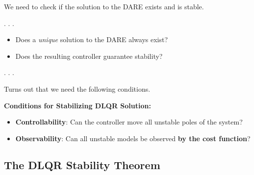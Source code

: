 \documentclass[
  letterpaper,
  DIV=11,
  numbers=noendperiod,
  oneside]{scrartcl}
\providecommand{\tightlist}{%
  \setlength{\itemsep}{0pt}\setlength{\parskip}{0pt}}
\begin{document}
We need to check if the solution to the DARE exists and is stable.

. . .

\begin{tcolorbox}[enhanced jigsaw, rightrule=.15mm, coltitle=black, titlerule=0mm, breakable, title=\textcolor{quarto-callout-tip-color}{\faLightbulb}\hspace{0.5em}{Questions}, bottomrule=.15mm, colback=white, toprule=.15mm, opacityback=0, opacitybacktitle=0.6, leftrule=.75mm, left=2mm, colbacktitle=quarto-callout-tip-color!10!white, bottomtitle=1mm, toptitle=1mm, arc=.35mm, colframe=quarto-callout-tip-color-frame]

\begin{itemize}
\tightlist
\item
  Does a \emph{unique} solution to the DARE always exist?
\item
  Does the resulting controller guarantee stability?
\end{itemize}

\end{tcolorbox}

. . .

Turns out that we need the following conditions.

\textbf{Conditions for Stabilizing DLQR Solution:}

\begin{itemize}
\tightlist
\item
  \textbf{Controllability}: Can the controller move all unstable poles
  of the system?
\item
  \textbf{Observability}: Can all unstable models be observed \textbf{by
  the cost function}?
\end{itemize}

\subsection{The DLQR Stability
Theorem}\label{the-dlqr-stability-theorem}
\end{document}

